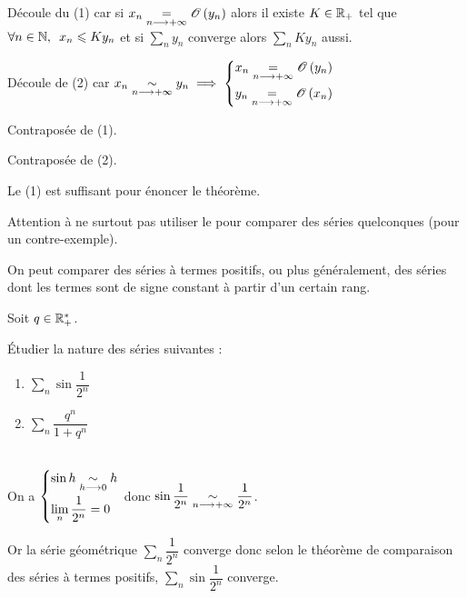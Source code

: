 \begin{dem}[2]
Découle du (1) car si \(x_n\underset{n\longrightarrow+\infty}{=}\mathscr{O}\left(y_n\right)\) alors il existe \(K\in\mathbb{R}_+\) tel que \(\quantifs{\forall n\in\N}x_n\leq Ky_n\) et si \(\sum_ny_n\) converge alors \(\sum_nKy_n\) aussi.
\end{dem}

\begin{dem}[3]
Découle de (2) car \(x_n\underset{n\longrightarrow+\infty}{\sim}y_n\implies\begin{dcases}
x_n\underset{n\longrightarrow+\infty}{=}\mathscr{O}\left(y_n\right) \\
y_n\underset{n\longrightarrow+\infty}{=}\mathscr{O}\left(x_n\right)
\end{dcases}\)
\end{dem}

\begin{dem}[4]
Contraposée de (1).
\end{dem}

\begin{dem}[5]
Contraposée de (2).
\end{dem}

\begin{rem}
Le (1) est suffisant pour énoncer le théorème.
\end{rem}

\begin{rem}
Attention à ne surtout pas utiliser le  pour comparer des séries quelconques (\cf pour un contre-exemple).

On peut comparer des séries à termes positifs, ou plus généralement, des séries dont les termes sont de signe constant à partir d'un certain rang.
\end{rem}

\begin{exoex}
Soit \(q\in\mathbb{R}_+^*\).

Étudier la nature des séries suivantes :

\begin{enumerate}
    \item \(\sum_n\sin\dfrac{1}{2^n}\) \\
    \item \(\sum_n\dfrac{q^n}{1+q^n}\)
\end{enumerate}
\end{exoex}

\begin{corr}[1]~\\
On a \(\begin{dcases}
\sin h\underset{h\longrightarrow0}{\sim}h \\
\lim_n\dfrac{1}{2^n}=0
\end{dcases}\) donc \(\sin\dfrac{1}{2^n}\underset{n\longrightarrow+\infty}{\sim}\dfrac{1}{2^n}\).

Or la série géométrique \(\sum_n\dfrac{1}{2^n}\) converge donc selon le théorème de comparaison des séries à termes positifs, \(\sum_n\sin\dfrac{1}{2^n}\) converge.
\end{corr}

